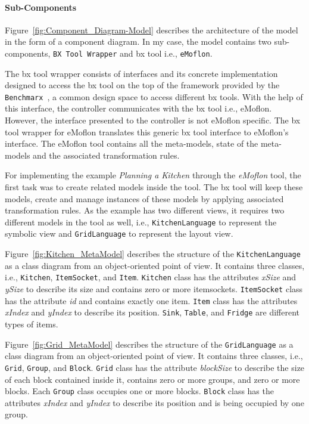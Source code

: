 \paragraph{Sub-Components}
Figure~\ref{fig:Component_Diagram-Model} describes the architecture of the model in the form of a component diagram. In my case, the model contains two sub-components, \texttt{BX Tool Wrapper} and bx tool i.e., \texttt{eMoflon}. 

The bx tool wrapper consists of interfaces and its concrete implementation designed to access the bx tool on the top of the framework provided by the \texttt{Benchmarx}~\cite{benchmarx-reload}, a common design space to access different bx tools. With the help of this interface, the controller communicates with the bx tool i.e., eMoflon. However, the interface presented to the controller is not eMoflon specific. The bx tool wrapper for eMoflon translates this generic bx tool interface to eMoflon's interface. The eMoflon tool contains all the meta-models, state of the meta-models and the associated transformation rules.

For implementing the example \textit{Planning a Kitchen} through the \textit{eMoflon} tool, the first task was to create related models inside the tool. The bx tool will keep these models, create and manage instances of these models by applying associated transformation rules. As the example has two different views, it requires two different models in the tool as well, i.e., \texttt{KitchenLanguage} to represent the symbolic view and \texttt{GridLanguage} to represent the layout view.

Figure~\ref{fig:Kitchen_MetaModel} describes the structure of the \texttt{KitchenLanguage} as a class diagram from an object-oriented point of view. It contains three classes, i.e., \texttt{Kitchen}, \texttt{ItemSocket}, and \texttt{Item}. \texttt{Kitchen} class has the attributes \textit{xSize} and \textit{ySize} to describe its size and contains zero or more itemsockets. \texttt{ItemSocket} class has the attribute \textit{id} and contains exactly one item. \texttt{Item} class has the attributes \textit{xIndex} and \textit{yIndex} to describe its position. \texttt{Sink}, \texttt{Table}, and \texttt{Fridge} are different types of items.

Figure~\ref{fig:Grid_MetaModel} describes the structure of the \texttt{GridLanguage} as a class diagram from an object-oriented point of view. It contains three classes, i.e., \texttt{Grid}, \texttt{Group}, and \texttt{Block}. \texttt{Grid} class has the attribute \textit{blockSize} to describe the size of each block contained inside it, contains zero or more groups, and zero or more blocks. Each \texttt{Group} class occupies one or more blocks. \texttt{Block} class has the attributes \textit{xIndex} and \textit{yIndex} to describe its position and is being occupied by one group.


